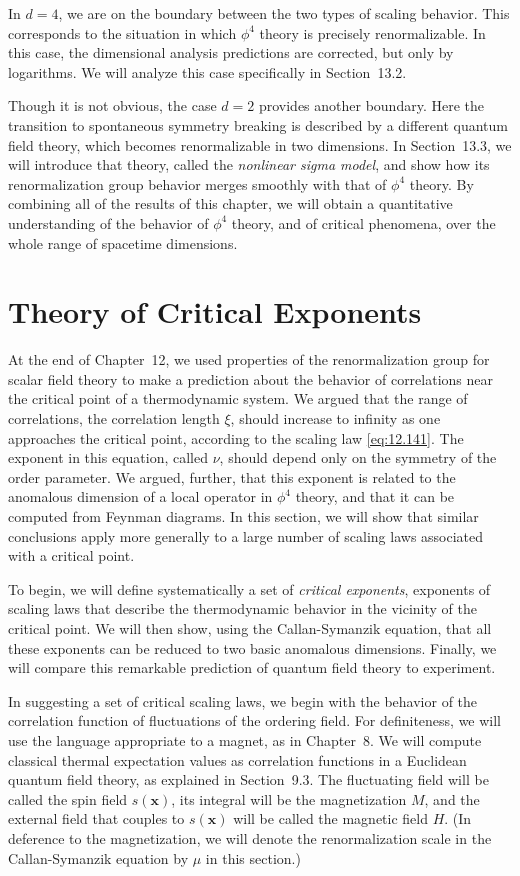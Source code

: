 In $d = 4$, we are on the boundary between the two types of scaling behavior.
This corresponds to the situation in which $\phi^4$ theory is precisely
renormalizable.  In this case, the dimensional analysis predictions are
corrected, but only by logarithms.  We will analyze this case specifically in
Section~13.2.

Though it is not obvious, the case $d = 2$ provides another boundary.  Here
the transition to spontaneous symmetry breaking is described by a different
quantum field theory, which becomes renormalizable in two dimensions.  In
Section~13.3, we will introduce that theory, called the \emph{nonlinear sigma
model}, and show how its renormalization group behavior merges smoothly with
that of $\phi^4$ theory.  By combining all of the results of this chapter, we
will obtain a quantitative understanding of the behavior of $\phi^4$ theory,
and of critical phenomena, over the whole range of spacetime dimensions.

\section{Theory of Critical Exponents}

At the end of Chapter~12, we used properties of the renormalization group for
scalar field theory to make a prediction about the behavior of correlations
near the critical point of a thermodynamic system.  We argued that the range
of correlations, the correlation length $\xi$, should increase to infinity as
one approaches the critical point, according to the scaling law
\eqref{eq:12.141}.  The exponent in this equation, called $\nu$, should
depend only on the symmetry of the order parameter.  We argued, further, that
this exponent is related to the anomalous dimension of a local operator in
$\phi^4$ theory, and that it can be computed from Feynman diagrams.  In this
section, we will show that similar conclusions apply more generally to a
large number of scaling laws associated with a critical point.

To begin, we will define systematically a set of \emph{critical exponents},
exponents of scaling laws that describe the thermodynamic behavior in the
vicinity of the critical point.  We will then show, using the Callan-Symanzik
equation, that all these exponents can be reduced to two basic anomalous
dimensions.  Finally, we will compare this remarkable prediction of quantum
field theory to experiment.

In suggesting a set of critical scaling laws, we begin with the behavior of the
correlation function of fluctuations of the ordering field.  For definiteness,
we will use the language appropriate to a magnet, as in Chapter~8.  We will
compute classical thermal expectation values as correlation functions in a
Euclidean quantum field theory, as explained in Section~9.3.  The fluctuating
field will be called the spin field $s(\mathbf{x})$, its integral will be the
magnetization $M$, and the external field that couples to $s(\mathbf{x})$ will
be called the magnetic field $H$.  (In deference to the magnetization, we will
denote the renormalization scale in the Callan-Symanzik equation by $\mu$ in
this section.)

